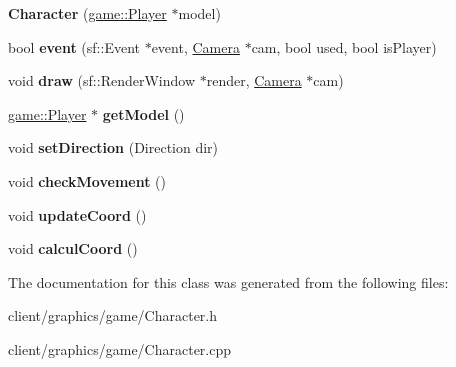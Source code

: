\begin{DoxyCompactItemize}
\item 
\hypertarget{classgraphics_1_1_character_a6914ec880883cd3ce78579c6dce19b26}{{\bfseries Character} (\hyperlink{classgame_1_1_player}{game\-::\-Player} $\ast$model)}\label{classgraphics_1_1_character_a6914ec880883cd3ce78579c6dce19b26}

\item 
\hypertarget{classgraphics_1_1_character_a442322e965cbb72d8ff1e9e7d5655f56}{bool {\bfseries event} (sf\-::\-Event $\ast$event, \hyperlink{classgraphics_1_1_camera}{Camera} $\ast$cam, bool used, bool is\-Player)}\label{classgraphics_1_1_character_a442322e965cbb72d8ff1e9e7d5655f56}

\item 
\hypertarget{classgraphics_1_1_character_ae69fc68ca2a1b3de822af779a41154c7}{void {\bfseries draw} (sf\-::\-Render\-Window $\ast$render, \hyperlink{classgraphics_1_1_camera}{Camera} $\ast$cam)}\label{classgraphics_1_1_character_ae69fc68ca2a1b3de822af779a41154c7}

\item 
\hypertarget{classgraphics_1_1_character_a6f4ccf165628f3de7bd403fc0ee185cf}{\hyperlink{classgame_1_1_player}{game\-::\-Player} $\ast$ {\bfseries get\-Model} ()}\label{classgraphics_1_1_character_a6f4ccf165628f3de7bd403fc0ee185cf}

\item 
\hypertarget{classgraphics_1_1_character_a28dd289bf33c84dd375e4c05949c5944}{void {\bfseries set\-Direction} (Direction dir)}\label{classgraphics_1_1_character_a28dd289bf33c84dd375e4c05949c5944}

\item 
\hypertarget{classgraphics_1_1_character_a377faad09368ec84e2b135de6f708dd7}{void {\bfseries check\-Movement} ()}\label{classgraphics_1_1_character_a377faad09368ec84e2b135de6f708dd7}

\item 
\hypertarget{classgraphics_1_1_character_a6420bf8af783913dcebddf84bb2db092}{void {\bfseries update\-Coord} ()}\label{classgraphics_1_1_character_a6420bf8af783913dcebddf84bb2db092}

\item 
\hypertarget{classgraphics_1_1_character_a968c29a77fa7a4f14d548530da37fda9}{void {\bfseries calcul\-Coord} ()}\label{classgraphics_1_1_character_a968c29a77fa7a4f14d548530da37fda9}

\end{DoxyCompactItemize}


The documentation for this class was generated from the following files\-:\begin{DoxyCompactItemize}
\item 
client/graphics/game/Character.\-h\item 
client/graphics/game/Character.\-cpp\end{DoxyCompactItemize}
